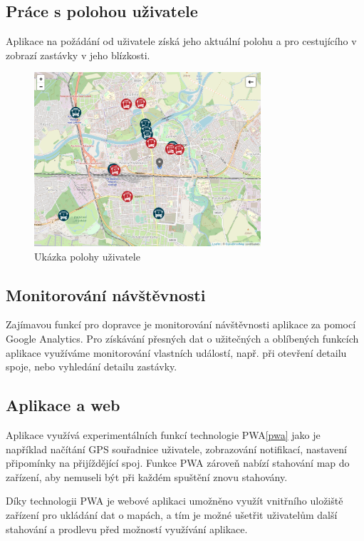 \subsection{Práce s polohou uživatele}
Aplikace na požádání od uživatele získá jeho aktuální polohu a pro cestujícího v zobrazí zastávky v jeho blízkosti.

\begin{figure}[H]
    \centering
    \includegraphics[width=0.75\textwidth]{images/position.png}
    \caption{Ukázka polohy uživatele}
    \label{poloha}
\end{figure}
\subsection{Monitorování návštěvnosti}
Zajímavou funkcí pro dopravce je monitorování návštěvnosti aplikace za pomocí Google Analytics. Pro získávání přesných dat o užitečných a oblíbených funkcích aplikace využíváme monitorování vlastních událostí, např. při otevření detailu spoje, nebo vyhledání detailu zastávky.
\subsection{Aplikace a web}
Aplikace využívá experimentálních funkcí technologie PWA\ref{pwa} jako je například načítání GPS souřadnice uživatele, zobrazování notifikací, nastavení připomínky na přijíždějící spoj.
Funkce PWA zároveň nabízí stahování map do zařízení, aby nemuseli být při každém spuštění znovu stahovány.

Díky technologii PWA je webové aplikaci umožněno využít vnitřního uložiště zařízení pro ukládání dat o mapách, a tím je možné ušetřit uživatelům další stahování a prodlevu před možností využívání aplikace.
